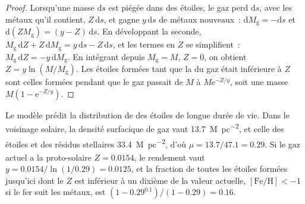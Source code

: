 \begin{proof}
Lorsqu'une masse $\mathrm{d}s$ est piégée dans des étoiles, le gaz perd
$\mathrm{d}s$, avec les métaux qu'il contient, $Z\,\mathrm{d}s$,
et gagne $y\,\mathrm{d}s$ de métaux nouveaux~:
$\mathrm{d}M_\mathrm{g} = -\mathrm{d}s$ et
$\mathrm{d}(Z M_\mathrm{g}) = (y - Z)\,\mathrm{d}s$. En développant la
seconde, $M_\mathrm{g}\,\mathrm{d}Z + Z\,\mathrm{d}M_\mathrm{g} =
y\,\mathrm{d}s - Z\,\mathrm{d}s$, et les termes en $Z$ se simplifient~:
$M_\mathrm{g}\,\mathrm{d}Z = -y\,\mathrm{d}M_\mathrm{g}$. En intégrant
depuis $M_\mathrm{g} = M$, $Z = 0$, on obtient $Z = y\ln(M/M_\mathrm{g})$. Les
étoiles formées tant que la  du gaz était inférieure à $Z$ sont celles formées
pendant que le gaz passait de $M$ à $M\mathrm{e}^{-Z/y}$, soit une masse
$M(1 - \mathrm{e}^{-Z/y})$.
\end{proof}

Le modèle prédit la distribution de  des étoiles de longue durée de vie.
Dans le voisinage solaire, la densité surfacique de gaz vaut
\qty{13.7}{M_\odot.pc^{-2}}, et celle des étoiles et des résidus stellaires
\qty{33.4}{M_\odot.pc^{-2}}, d'où $\mu = 13.7/47.1 = 0.29$. Si le gaz
actuel a la  proto-solaire $Z = 0.0154$, le rendement vaut
$y = 0.0154/\ln(1/0.29) = 0.0125$, et la fraction de toutes les étoiles
formées jusqu'ici dont le $Z$ est inférieur à un dixième de la valeur actuelle,
$[\mathrm{Fe/H}] < -1$ si le fer suit les métaux, est
$(1 - 0.29^{0.1})/(1 - 0.29) = 0.16$.

